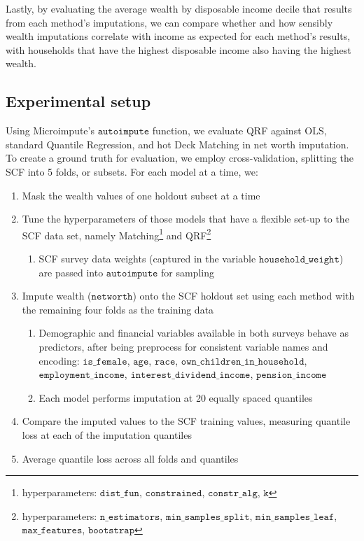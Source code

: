 Lastly, by evaluating the average wealth by disposable income decile that results from each method's imputations, we can compare whether and how sensibly wealth imputations correlate with income as expected for each method's results, with households that have the highest disposable income also having the highest wealth. 

\subsection{Experimental setup}

Using Microimpute's $\texttt{autoimpute}$ function, we evaluate QRF against OLS, standard Quantile Regression, and hot Deck Matching in net worth imputation. To create a ground truth for evaluation, we employ cross-validation, splitting the SCF into 5 folds, or subsets. For each model at a time, we:

\begin{enumerate}
    \item Mask the wealth values of one holdout subset at a time

    \item Tune the hyperparameters of those models that have a flexible set-up to the SCF data set, namely Matching\footnote{hyperparameters: $\texttt{dist\_fun}$, $\texttt{constrained}$, $\texttt{constr\_alg}$, $\texttt{k}$} and QRF\footnote{hyperparameters: $\texttt{n\_estimators}$, $\texttt{min\_samples\_split}$, $\texttt{min\_samples\_leaf}$, $\texttt{max\_features}$, $\texttt{bootstrap}$}
    \begin{enumerate}
        \item SCF survey data weights (captured in the variable $\texttt{household\_weight}$) are passed into $\texttt{autoimpute}$ for sampling
    \end{enumerate}

    \item Impute wealth ($\texttt{networth}$) onto the SCF holdout set using each method with the remaining four folds as the training data
    \begin{enumerate}
        \item Demographic and financial variables available in both surveys behave as predictors, after being preprocess for consistent variable names and encoding: $\texttt{is\_female}$, $\texttt{age}$, $\texttt{race}$, $\texttt{own\_children\_in\_household}$, $\texttt{employment\_income}$, $\texttt{interest\_dividend\_income}$, $\texttt{pension\_income}$ 
        \item Each model performs imputation at 20 equally spaced quantiles
    \end{enumerate}

    \item Compare the imputed values to the SCF training values, measuring quantile loss at each of the imputation quantiles 

    \item Average quantile loss across all folds and quantiles
\end{enumerate}

